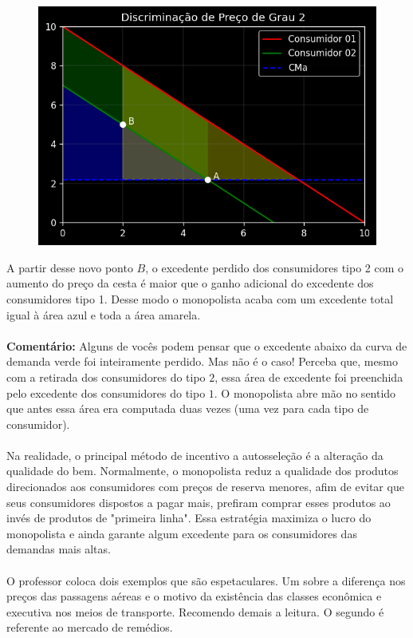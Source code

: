 \documentclass[a4paper,11pt,oneside]{book}
\theoremstyle{definition}
\theoremstyle{break}
\begin{document}
\begin{figure}[H]
\centering
\includegraphics[scale=0.8]{cap26_3-discriminacao_grau2_3.png}
\end{figure}

A partir desse novo ponto $B$, o excedente perdido dos consumidores tipo 2 com o aumento do preço da cesta é maior que o ganho adicional do excedente dos consumidores tipo 1. Desse modo o monopolista acaba com um excedente total igual à área azul e toda a área amarela.
\\~\\
\textbf{Comentário:} Alguns de vocês podem pensar que o excedente abaixo da curva de demanda verde foi inteiramente perdido. Mas não é o caso! Perceba que, mesmo com a retirada dos consumidores do tipo $2$, essa área de excedente foi preenchida pelo excedente dos consumidores do tipo $1$. O monopolista abre mão no sentido que antes essa área era computada duas vezes (uma vez para cada tipo de consumidor).
\\~\\
Na realidade, o principal método de incentivo a autosseleção é a alteração da qualidade do bem. Normalmente, o monopolista reduz a qualidade dos produtos direcionados aos consumidores com preços de reserva menores, afim de evitar que seus consumidores dispostos a pagar mais, prefiram comprar esses produtos ao invés de produtos de "primeira linha". Essa estratégia maximiza o lucro do monopolista e ainda garante algum excedente para os consumidores das demandas mais altas.
\\~\\
O professor coloca dois exemplos que são espetaculares. Um sobre a diferença nos preços das passagens aéreas e o motivo da existência das classes econômica e executiva nos meios de transporte. Recomendo demais a leitura. O segundo é referente ao mercado de remédios.
\end{document}
